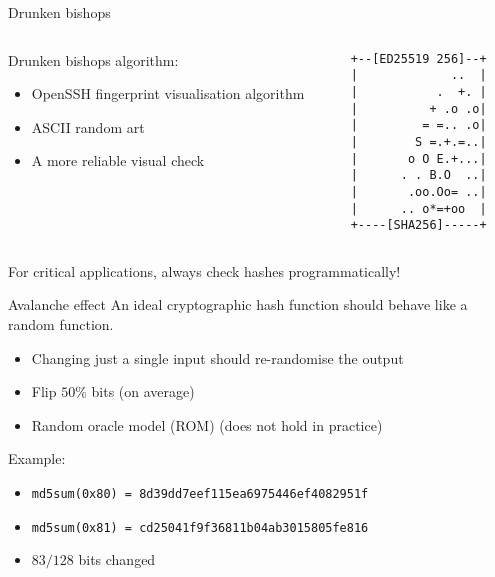 \begin{frame}[fragile]{Drunken bishops}
  \begin{columns}[onlytextwidth]
    \begin{column}{0.6\textwidth}
      \pause
      Drunken bishops algorithm:
      \begin{itemize}[<+(1)->]
        \item OpenSSH fingerprint visualisation algorithm
        \item ASCII random art
        \item A more reliable visual check
      \end{itemize}
    \end{column}
    \begin{column}{0.3\textwidth}
      \begin{Verbatim}[fontsize=\scriptsize]
+--[ED25519 256]--+
|             ..  |
|           .  +. |
|          + .o .o|
|         = =.. .o|
|        S =.+.=..|
|       o O E.+...|
|      . . B.O  ..|
|       .oo.Oo= ..|
|      .. o*=+oo  |
+----[SHA256]-----+
      \end{Verbatim}
    \end{column}
  \end{columns}

  \vfill

  \pause
  For critical applications, always check hashes programmatically!
\end{frame}

\begin{frame}{Avalanche effect}
  An ideal cryptographic hash function should behave like a random function.
  \begin{itemize}[<+(1)->]
    \item Changing just a single input should re-randomise the output
    \item Flip $50\%$ bits (on average)
    \item Random oracle model (ROM) (does not hold in practice)
  \end{itemize}

  \vspace*{1em}

  \pause
  Example:
  \begin{itemize}
    \item {\small\texttt{md5sum(0x80) = 8d39dd7eef115ea6975446ef4082951f}}
    \item {\small\texttt{md5sum(0x81) = cd25041f9f36811b04ab3015805fe816}}
    \pause\item $83/128$ bits changed
  \end{itemize}
\end{frame}

